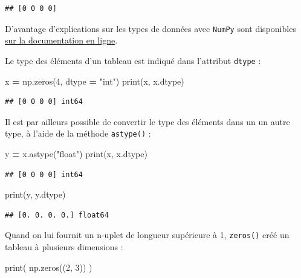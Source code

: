 \documentclass[12pt,]{book}
\newenvironment{Shaded}{\begin{snugshade}}{\end{snugshade}}
\newcommand{\DecValTok}[1]{\textcolor[rgb]{0.00,0.00,0.81}{#1}}
\newcommand{\StringTok}[1]{\textcolor[rgb]{0.31,0.60,0.02}{#1}}
\newcommand{\OperatorTok}[1]{\textcolor[rgb]{0.81,0.36,0.00}{\textbf{#1}}}
\newcommand{\BuiltInTok}[1]{#1}
\newcommand{\NormalTok}[1]{#1}
\numberwithin{equation}{section}
\numberwithin{countremarque}{section}
\begin{document}
\begin{lstlisting}
## [0 0 0 0]
\end{lstlisting}

D'avantage d'explications sur les types de données avec \texttt{NumPy}
sont disponibles
\href{https://docs.scipy.org/doc/numpy-1.15.1/reference/arrays.dtypes.html}{sur
la documentation en ligne}.

Le type des éléments d'un tableau est indiqué dans l'attribut
\texttt{dtype} :

\begin{Shaded}
\begin{Highlighting}[]
\NormalTok{x }\OperatorTok{=}\NormalTok{ np.zeros(}\DecValTok{4}\NormalTok{, dtype }\OperatorTok{=} \StringTok{"int"}\NormalTok{)}
\BuiltInTok{print}\NormalTok{(x, x.dtype)}
\end{Highlighting}
\end{Shaded}

\begin{lstlisting}
## [0 0 0 0] int64
\end{lstlisting}

Il est par ailleurs possible de convertir le type des éléments dans un
un autre type, à l'aide de la méthode \texttt{astype()} :

\begin{Shaded}
\begin{Highlighting}[]
\NormalTok{y }\OperatorTok{=}\NormalTok{ x.astype(}\StringTok{"float"}\NormalTok{)}
\BuiltInTok{print}\NormalTok{(x, x.dtype)}
\end{Highlighting}
\end{Shaded}

\begin{lstlisting}
## [0 0 0 0] int64
\end{lstlisting}

\begin{Shaded}
\begin{Highlighting}[]
\BuiltInTok{print}\NormalTok{(y, y.dtype)}
\end{Highlighting}
\end{Shaded}

\begin{lstlisting}
## [0. 0. 0. 0.] float64
\end{lstlisting}

Quand on lui fournit un n-uplet de longueur supérieure à 1,
\texttt{zeros()} créé un tableau à plusieurs dimensions :

\begin{Shaded}
\begin{Highlighting}[]
\BuiltInTok{print}\NormalTok{( np.zeros((}\DecValTok{2}\NormalTok{, }\DecValTok{3}\NormalTok{)) )}
\end{Highlighting}
\end{Shaded}
\end{document}
